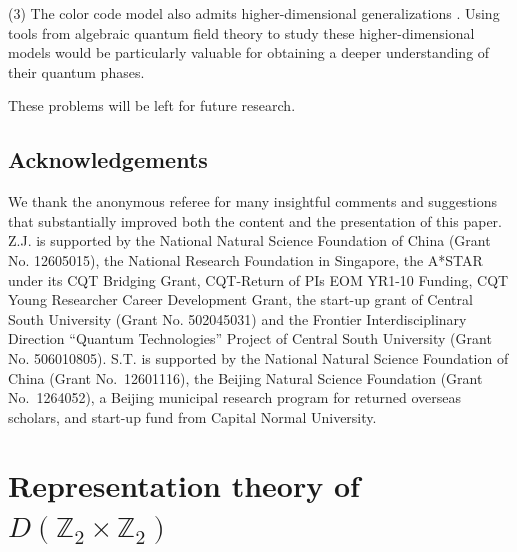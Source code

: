 \documentclass[a4paper,11pt]{article}
\theoremstyle{definition}
\theoremstyle{remark}
\theoremstyle{remark}
\begin{document}
(3) The color code model also admits higher-dimensional generalizations \cite{Kubica2015color}.  
Using tools from algebraic quantum field theory to study these higher-dimensional models would be particularly valuable for obtaining a deeper understanding of their quantum phases.  



These problems will be left for future research.

\subsection*{Acknowledgements}

We thank the anonymous referee for many insightful comments and suggestions that substantially improved both the content and the
presentation of this paper.
Z.J. is supported by the National Natural Science Foundation of China (Grant
No. 12605015), the National Research Foundation in Singapore, the A*STAR under its CQT Bridging Grant, CQT-Return of PIs EOM YR1-10 Funding,  CQT Young Researcher Career Development Grant, the start-up grant of Central South University (Grant No. 502045031) and the Frontier Interdisciplinary Direction ``Quantum Technologies'' Project of Central South University (Grant No. 506010805).
S.T. is supported by the National Natural Science Foundation of China (Grant No.~12601116), the Beijing Natural Science Foundation (Grant No.~1264052), a Beijing municipal research program for returned overseas scholars, and start-up fund from Capital Normal University.





\appendix

\section{Representation theory of $D(\mathbb{Z}_2\times \mathbb{Z}_2)$} \label{app:rep_doubld}


\end{document}
